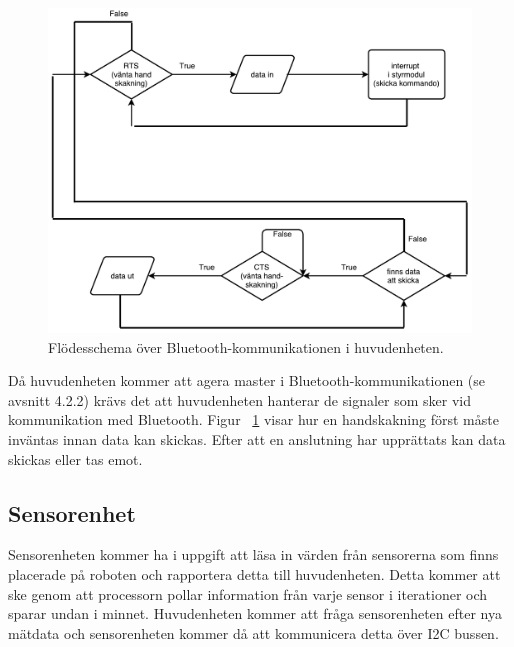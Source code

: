 \documentclass{article}
\begin{document}
\begin{figure}[H]
\centering
\includegraphics[scale=0.45]{Bluetooth_kommunikation_i_robot}
\caption{Flödesschema över Bluetooth-kommunikationen i huvudenheten.}
\label{fig:Bluetooth_kommunikation_i_robot}
\end{figure}
Då huvudenheten kommer att agera master i Bluetooth-kommunikationen (se avsnitt 4.2.2) krävs det att huvudenheten hanterar de signaler som sker vid kommunikation med Bluetooth. Figur ~\ref{fig:Bluetooth_kommunikation_i_robot} visar hur en handskakning först måste inväntas innan data kan skickas. Efter att en anslutning har upprättats kan data skickas eller tas emot. 


\clearpage

\subsection{Sensorenhet}
Sensorenheten kommer ha i uppgift att läsa in värden från sensorerna som finns placerade på roboten och rapportera detta till huvudenheten. Detta kommer att ske genom att processorn pollar information från varje sensor i iterationer och sparar undan i minnet. Huvudenheten kommer att fråga sensorenheten efter nya mätdata och sensorenheten kommer då att kommunicera detta över I2C bussen.
\end{document}
